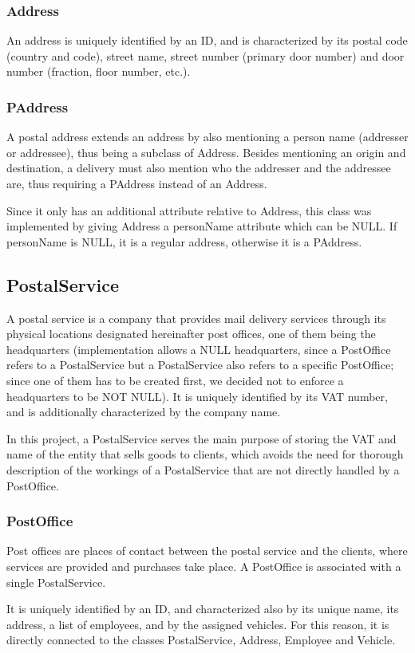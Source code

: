 \documentclass{report}[a4paper]
\theoremstyle{remark}
\begin{document}
\subsubsection{Address}
An address is uniquely identified by an ID, and is characterized by its postal code (country and code), street name, street number (primary door number) and door number (fraction, floor number, etc.).
\subsubsection{PAddress}
A postal address extends an address by also mentioning a person name (addresser or addressee), thus being a subclass of Address. Besides mentioning an origin and destination, a delivery must also mention who the addresser and the addressee are, thus requiring a PAddress instead of an Address.\par
Since it only has an additional attribute relative to Address, this class was implemented by giving Address a personName attribute which can be NULL. If personName is NULL, it is a regular address, otherwise it is a PAddress.
\subsection{PostalService}
A postal service is a company that provides mail delivery services through its physical locations designated hereinafter post offices, one of them being the headquarters (implementation allows a NULL headquarters, since a PostOffice refers to a PostalService but a PostalService also refers to a specific PostOffice; since one of them has to be created first, we decided not to enforce a headquarters to be NOT NULL). It is uniquely identified by its VAT number, and is additionally characterized by the company name. \par
In this project, a PostalService serves the main purpose of storing the VAT and name of the entity that sells goods to clients, which avoids the need for thorough description of the workings of a PostalService that are not directly handled by a PostOffice.
\subsubsection{PostOffice}
Post offices are places of contact between the postal service and the clients, where services are provided and purchases take place. A PostOffice is associated with a single PostalService.\par
It is uniquely identified by an ID, and characterized also by its unique name, its address, a list of employees, and by the assigned vehicles. For this reason, it is directly connected to the classes PostalService, Address, Employee and Vehicle.
\end{document}
